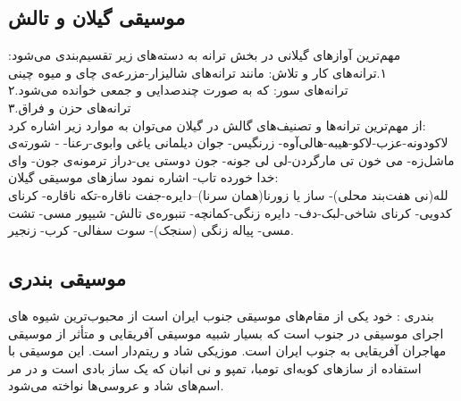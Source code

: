 \subsection{موسیقی گیلان و تالش}
مهم‌ترین آوازهای گیلانی در بخش ترانه به دسته‌های زیر تقسیم‌بندی می‌شود:
۱.ترانه‌های کار و تلاش: مانند ترانه‌های شالیزار-مزرعه‌ی چای و میوه چینی\\
۲.ترانه‌های سور: که به صورت چندصدایی و جمعی خوانده می‌شود\\
۳.ترانه‌های حزن و فراق\\
از مهم‌ترین ترانه‌ها و تصنیف‌های گالش در گیلان می‌توان به موارد زیر اشاره کرد:\\
لاکودونه-عزب-لاکو-هیبه-هالی‌آوه- زرنگیس- جوان دیلمانی یاغی وابوی-رعنا- - شورته‌ی ماشل‌زه- می خون تی مارگردن-لی لی جونه- جون دوستی یی-دراز ترمونه‌ی جون- وای خدا خورده تاب- اشاره نمود
 سازهای موسیقی گیلان:\\
 لله(نی هفت‌بند محلی)- ساز یا زورنا(همان سرنا)--دایره-جفت ناقاره-تکه ناقاره- کرنای کدویی- کرنای شاخی-لبک-دف- دایره زنگی-کمانچه- تنبوره‌ی تالش- شیپور مسی- تشت مسی- پیاله زنگی (سنجک)- سوت سفالی- کرب- زنجیر.\\
 \subsection{موسیقی بندری}
 بندری : خود یکی از مقام‌های موسیقی جنوب ایران است از محبوب‌ترین شیوه های اجرای موسیقی در جنوب است که بسیار شبیه موسیقی آفریقایی و متأثر از موسیقی مهاجران آفریقایی به جنوب ایران است. موزیکی شاد و ریتم‌دار است. این موسیقی با استفاده از ساز‌های کوبه‌ای تومبا، تمپو و نی انبان که یک ساز بادی است و در مر
 اسم‌های شاد و عروسی‌ها نواخته می‌شود.

 